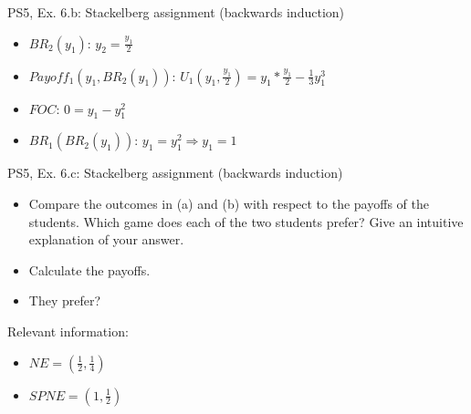 \begin{frame}{PS5, Ex. 6.b: Stackelberg assignment (backwards induction)}
\begin{multicols}{2}
\begin{itemize}
        \item[4] $BR_2(y_1)$: $y_2 = \frac{y_1}{2}$ \\
        \item[5] $Payoff_1(y_1,BR_2(y_1))$: $U_1(y_1,\frac{y_1}{2}) = y_1*\frac{y_1}{2}-\frac{1}{3}y_1^3$ \\
        \item[6] $FOC$: $0 = y_1 - y_1^2$ \\
        \item[7] $BR_1(BR_2(y_1))$: $y_1 = y_1^2 \Rightarrow y_1=1$ \\
    \end{itemize}
    \vfill\null
  \end{multicols}
\end{frame}

\begin{frame}{PS5, Ex. 6.c: Stackelberg assignment (backwards induction)}
  \begin{itemize}
    \item[(c)] Compare the outcomes in (a) and (b) with respect to the payoffs of the students. Which game does each of the two students prefer? Give an intuitive explanation of your answer.
  \end{itemize}
  \begin{multicols}{2}
    \begin{itemize}
        \item[(Step 1)] Calculate the payoffs.
        \item[(Step 2)] They prefer? 
    \end{itemize}
    \vfill\null \columnbreak
    Relevant information:
    \begin{itemize}
        \item[(a)] \begin{math} NE=\left(\frac{1}{2},\frac{1}{4}\right)\end{math}
        \item[(b)] \begin{math} SPNE=\left(1,\frac{1}{2}\right)\end{math}
    \end{itemize}
  \end{multicols}
\end{frame}
